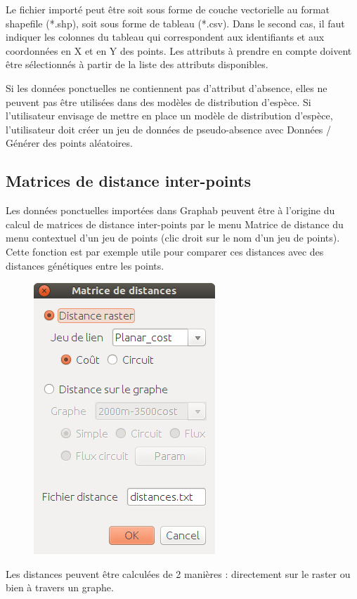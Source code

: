 \documentclass{article}
\begin{document}
Le fichier importé peut être soit sous forme de couche vectorielle au format shapefile (*.shp), soit sous forme de tableau (*.csv). Dans le second cas, il faut indiquer les colonnes du tableau qui correspondent aux identifiants et aux coordonnées en X et en Y des points. Les attributs à prendre en compte doivent être sélectionnés à partir de la liste des attributs disponibles.

Si les données ponctuelles ne contiennent pas d’attribut d’absence, elles ne peuvent pas être utilisées dans des modèles de distribution d’espèce. Si l’utilisateur envisage de mettre en place un modèle de distribution d’espèce, l’utilisateur doit créer un jeu de données de pseudo-absence avec Données / Générer des points aléatoires.

\subsection{Matrices de distance inter-points}

Les données ponctuelles importées dans Graphab peuvent être à l’origine du calcul de matrices de distance inter-points par le menu Matrice de distance du menu contextuel d'un jeu de points (clic droit sur le nom d’un jeu de points). Cette fonction est par exemple utile pour comparer ces distances avec des distances génétiques entre les points.

\begin{figure}[H]
	\includegraphics[scale=0.5]{img/manual-fr_point_matrix.png} 
\end{figure}

Les distances peuvent être calculées de 2 manières : directement sur le raster ou bien à travers un graphe.
\end{document}
